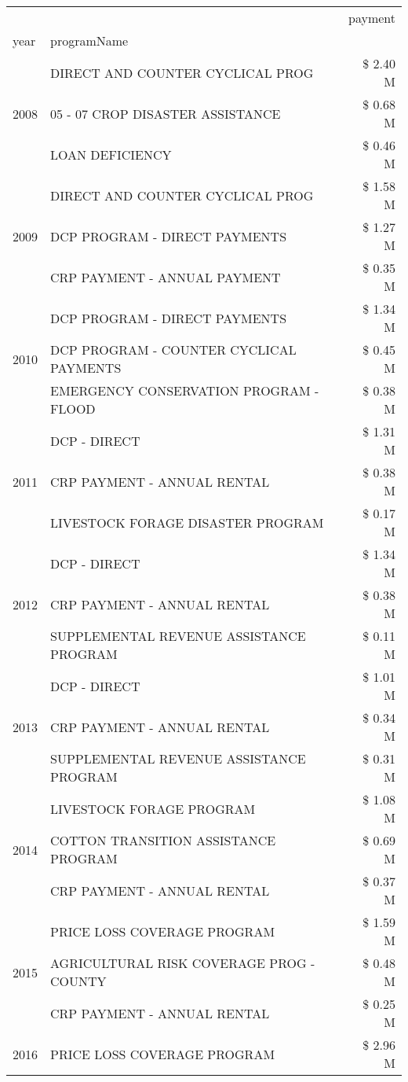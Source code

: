 \begin{tabular}{llr}
\toprule
 &  & payment \\
year & programName &  \\
\midrule
\multirow[t]{3}{*}{2008} & DIRECT AND COUNTER CYCLICAL PROG & \$ 2.40 M \\
 & 05 - 07 CROP DISASTER ASSISTANCE & \$ 0.68 M \\
 & LOAN DEFICIENCY & \$ 0.46 M \\
\cline{1-3}
\multirow[t]{3}{*}{2009} & DIRECT AND COUNTER CYCLICAL PROG & \$ 1.58 M \\
 & DCP PROGRAM - DIRECT PAYMENTS & \$ 1.27 M \\
 & CRP PAYMENT - ANNUAL PAYMENT & \$ 0.35 M \\
\cline{1-3}
\multirow[t]{3}{*}{2010} & DCP PROGRAM - DIRECT PAYMENTS & \$ 1.34 M \\
 & DCP PROGRAM - COUNTER CYCLICAL PAYMENTS & \$ 0.45 M \\
 & EMERGENCY CONSERVATION PROGRAM - FLOOD & \$ 0.38 M \\
\cline{1-3}
\multirow[t]{3}{*}{2011} & DCP - DIRECT & \$ 1.31 M \\
 & CRP PAYMENT - ANNUAL RENTAL & \$ 0.38 M \\
 & LIVESTOCK FORAGE DISASTER PROGRAM & \$ 0.17 M \\
\cline{1-3}
\multirow[t]{3}{*}{2012} & DCP - DIRECT & \$ 1.34 M \\
 & CRP PAYMENT - ANNUAL RENTAL & \$ 0.38 M \\
 & SUPPLEMENTAL REVENUE ASSISTANCE PROGRAM & \$ 0.11 M \\
\cline{1-3}
\multirow[t]{3}{*}{2013} & DCP - DIRECT & \$ 1.01 M \\
 & CRP PAYMENT - ANNUAL RENTAL & \$ 0.34 M \\
 & SUPPLEMENTAL REVENUE ASSISTANCE PROGRAM & \$ 0.31 M \\
\cline{1-3}
\multirow[t]{3}{*}{2014} & LIVESTOCK FORAGE PROGRAM & \$ 1.08 M \\
 & COTTON TRANSITION ASSISTANCE PROGRAM & \$ 0.69 M \\
 & CRP PAYMENT - ANNUAL RENTAL & \$ 0.37 M \\
\cline{1-3}
\multirow[t]{3}{*}{2015} & PRICE LOSS COVERAGE PROGRAM & \$ 1.59 M \\
 & AGRICULTURAL RISK COVERAGE PROG - COUNTY & \$ 0.48 M \\
 & CRP PAYMENT - ANNUAL RENTAL & \$ 0.25 M \\
\cline{1-3}
\multirow[t]{3}{*}{2016} & PRICE LOSS COVERAGE PROGRAM                   & \$ 2.96 M \\

\end{tabular}

